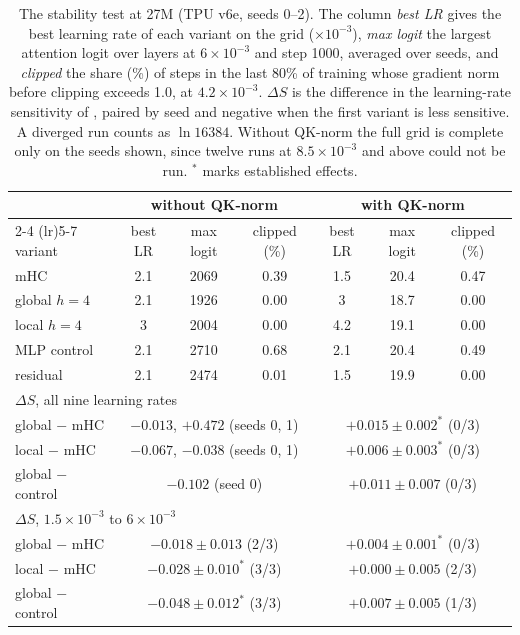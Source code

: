 \documentclass[11pt, a4paper]{article}
\newcommand{\lr}[1]{\ensuremath{#1 \times 10^{-3}}}
\newcommand{\est}{^{\ast}}
\begin{document}
\begin{table}[ht]
  \centering
  \caption{The stability test at 27M (TPU v6e, seeds 0--2). The column \emph{best LR} gives the best learning rate of each variant
    on the grid ($\times 10^{-3}$), \emph{max logit} the largest attention logit over layers at \lr{6} and step 1000, averaged over
    seeds, and \emph{clipped} the share (\%) of steps in the last 80\% of training whose gradient norm before clipping exceeds 1.0, at
    \lr{4.2}. $\Delta S$ is the difference in the learning-rate sensitivity of \citet{wortsman2023proxies}, paired by seed and
    negative when the first variant is less sensitive. A diverged run counts as $\ln 16384$. Without QK-norm the full grid is
    complete only on the seeds shown, since twelve runs at \lr{8.5} and above could not be run. $\est$ marks established effects.}
  \label{tab:stability}
  \small
  \setlength{\tabcolsep}{4pt}
  \begin{tabular}{lcccccc}
    \toprule
    & \multicolumn{3}{c}{without QK-norm} & \multicolumn{3}{c}{with QK-norm} \\
    \cmidrule(lr){2-4} \cmidrule(lr){5-7}
    variant & best LR & max logit & clipped (\%) & best LR & max logit & clipped (\%) \\
    \midrule
    mHC & 2.1 & 2069 & 0.39 & 1.5 & 20.4 & 0.47 \\
    global $h = 4$ & 2.1 & 1926 & 0.00 & 3 & 18.7 & 0.00 \\
    local $h = 4$ & 3 & 2004 & 0.00 & 4.2 & 19.1 & 0.00 \\
    MLP control & 2.1 & 2710 & 0.68 & 2.1 & 20.4 & 0.49 \\
    residual & 2.1 & 2474 & 0.01 & 1.5 & 19.9 & 0.00 \\
    \midrule
    \multicolumn{7}{l}{$\Delta S$, all nine learning rates} \\
    \quad global $-$ mHC & \multicolumn{3}{c}{$-0.013$, $+0.472$ (seeds 0, 1)} & \multicolumn{3}{c}{$+0.015 \pm 0.002\est$ (0/3)} \\
    \quad local $-$ mHC & \multicolumn{3}{c}{$-0.067$, $-0.038$ (seeds 0, 1)} & \multicolumn{3}{c}{$+0.006 \pm 0.003\est$ (0/3)} \\
    \quad global $-$ control & \multicolumn{3}{c}{$-0.102$ (seed 0)} & \multicolumn{3}{c}{$+0.011 \pm 0.007$ (0/3)} \\
    \midrule
    \multicolumn{7}{l}{$\Delta S$, \lr{1.5} to \lr{6}} \\
    \quad global $-$ mHC & \multicolumn{3}{c}{$-0.018 \pm 0.013$ (2/3)} & \multicolumn{3}{c}{$+0.004 \pm 0.001\est$ (0/3)} \\
    \quad local $-$ mHC & \multicolumn{3}{c}{$-0.028 \pm 0.010\est$ (3/3)} & \multicolumn{3}{c}{$+0.000 \pm 0.005$ (2/3)} \\
    \quad global $-$ control & \multicolumn{3}{c}{$-0.048 \pm 0.012\est$ (3/3)} & \multicolumn{3}{c}{$+0.007 \pm 0.005$ (1/3)} \\
    \bottomrule
  \end{tabular}
\end{table}
\end{document}
